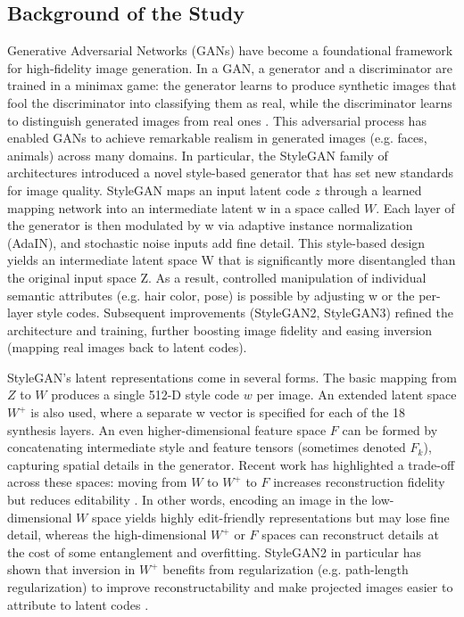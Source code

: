 \subsection{Background of the Study}

Generative Adversarial Networks (GANs) have
become a foundational framework for high-fidelity image generation. 
In a GAN, a generator and a discriminator are trained in a minimax game: 
the generator learns to produce synthetic images that fool the discriminator 
into classifying them as real, while the discriminator learns to distinguish generated images from real ones \cite{GAN}.
This adversarial process has enabled GANs to achieve remarkable realism in generated images (e.g. faces, animals) across many domains.
In particular, the StyleGAN family of architectures \cite{karras2020analyzingimprovingimagequality} 
introduced a novel style-based generator that has set new standards for image quality.
StyleGAN maps an input latent code $z$ through a learned mapping network into an intermediate latent w in a space called $W$. 
Each layer of the generator is then modulated by w via adaptive instance normalization (AdaIN), 
and stochastic noise inputs add fine detail. This style-based design yields an intermediate
latent space W that is significantly more disentangled than the original input space Z.
As a result, controlled manipulation of individual semantic attributes (e.g. hair color, pose) 
is possible by adjusting w or the per-layer style codes. Subsequent improvements (StyleGAN2, StyleGAN3) 
refined the architecture and training, further boosting image fidelity and easing inversion (mapping real images back to latent codes).


StyleGAN's latent representations come in several forms. The basic mapping from $Z$ to $W$ produces a single 512-D style code $w$ per image.
An extended latent space $W^+$ is also used, where a separate w vector is specified for each of the 18 synthesis layers.
An even higher-dimensional feature space $F$ can be formed by concatenating intermediate style and feature tensors 
(sometimes denoted $F_k$), capturing spatial details in the generator. 
Recent work has highlighted a trade-off across these spaces: moving from $W$ to $W^+$ to $F$ increases reconstruction 
fidelity but reduces editability \cite{liu2023delvingstyleganinversionimage} .
In other words, encoding an image in the low-dimensional $W$ space yields highly edit-friendly representations but may lose fine 
detail, whereas the high-dimensional $W^+$ or $F$ spaces can reconstruct details at the cost of some entanglement and overfitting.
StyleGAN2 in particular has shown that inversion in $W^+$ benefits from regularization (e.g. path-length regularization) 
to improve reconstructability and make projected images easier to attribute to latent codes \cite{karras2020analyzingimprovingimagequality}.

